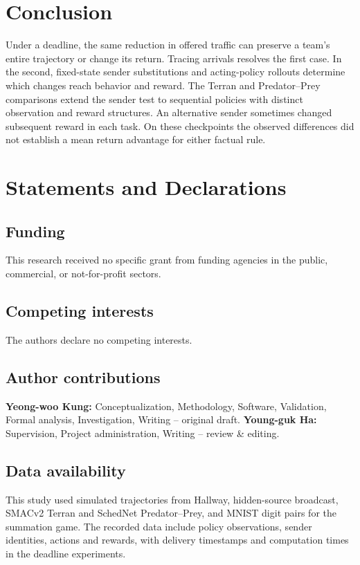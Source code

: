 \documentclass[pdflatex,sn-mathphys-num]{sn-jnl}
\begin{document}
\section{Conclusion}\label{sec:conclusion}
Under a deadline, the same reduction in offered traffic can preserve a team's entire trajectory or change its return. Tracing arrivals resolves the first case. In the second, fixed-state sender substitutions and acting-policy rollouts determine which changes reach behavior and reward. The Terran and Predator--Prey comparisons extend the sender test to sequential policies with distinct observation and reward structures. An alternative sender sometimes changed subsequent reward in each task. On these checkpoints the observed differences did not establish a mean return advantage for either factual rule.

\FloatBarrier
\section*{Statements and Declarations}

\subsection*{Funding}
This research received no specific grant from funding agencies in the public, commercial, or not-for-profit sectors.

\subsection*{Competing interests}
The authors declare no competing interests.

\subsection*{Author contributions}
\textbf{Yeong-woo Kung:} Conceptualization, Methodology, Software, Validation, Formal analysis, Investigation, Writing -- original draft. \textbf{Young-guk Ha:} Supervision, Project administration, Writing -- review \& editing.

\subsection*{Data availability}
This study used simulated trajectories from Hallway, hidden-source broadcast, SMACv2 Terran and SchedNet Predator--Prey, and MNIST digit pairs for the summation game. The recorded data include policy observations, sender identities, actions and rewards, with delivery timestamps and computation times in the deadline experiments.
\end{document}
